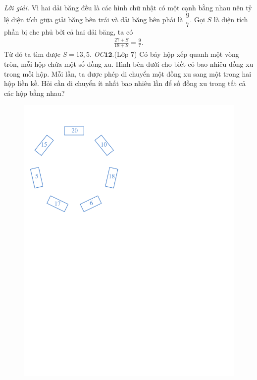 \begin{multicols}{2}
\begin{figure}[H]
		\vspace*{-15pt}
	\end{figure}
	\textit{Lời giải.} Vì hai dải băng đều là các hình chữ nhật có một cạnh bằng nhau nên tỷ lệ diện tích giữa giải băng bên trái và dải băng bên phải là $\dfrac{9}{7}.$ Gọi $S$ là diện tích 
	phần bị che phủ bởi cả hai dải băng, ta có
	\begin{align*}
		\frac{27+S}{18+S}=\frac{9}{7}.
	\end{align*}
	Từ đó ta tìm được $S=13{,}5$.
	\vskip 0.1cm
	\textit{\color{cackithi}OC$\pmb{12.}$}(Lớp $7$) Có bảy hộp xếp quanh một vòng tròn, mỗi hộp chứa một số đồng xu.
	Hình bên dưới cho biết có bao nhiêu đồng xu trong mỗi hộp.
	\vskip 0.1cm
	Mỗi lần, ta được phép di chuyển một đồng xu sang một trong hai hộp liền kề. Hỏi cần di chuyển ít nhất bao nhiêu lần để số đồng xu trong tất cả các hộp bằng nhau?
	\begin{figure}[H]
		\vspace*{-5pt}
		\centering
		\captionsetup{labelformat= empty, justification=centering}
		\includegraphics[width= 0.85\linewidth]{2.pdf}

\end{figure}
\end{multicols}

